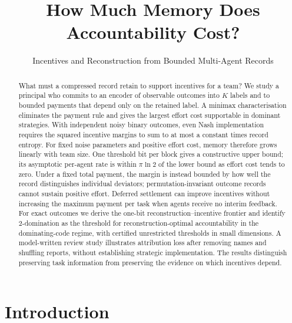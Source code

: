 \documentclass[sigconf,anonymous,acmthm=false]{aamas}
\theoremstyle{acmplain}
\theoremstyle{acmdefinition}
\begin{document}
\title[How Much Memory Does Accountability Cost?]{How Much Memory Does Accountability Cost?}
\subtitle{Incentives and Reconstruction from Bounded Multi-Agent Records}

\begin{abstract}
What must a compressed record retain to support incentives for a team? We study a principal
who commits to an encoder of observable outcomes into $K$ labels and to bounded payments
that depend only on the retained label. A minimax characterisation eliminates the payment
rule and gives the largest effort cost supportable in dominant strategies. With independent
noisy binary outcomes, even Nash implementation requires the squared incentive margins to
sum to at most a constant times record entropy. For fixed noise parameters and positive
effort cost, memory therefore grows linearly with team size. One threshold bit per block
gives a constructive upper bound; its asymptotic per-agent rate is within $\pi\ln2$ of the
lower bound as effort cost tends to zero. Under a fixed total payment, the margin is instead
bounded by how well the record distinguishes individual deviators; permutation-invariant
outcome records cannot sustain positive effort. Deferred settlement can improve incentives
without increasing the maximum payment per task when agents receive no interim feedback.
For exact outcomes we derive the one-bit reconstruction--incentive frontier and identify
2-domination as the threshold for reconstruction-optimal accountability in the dominating-code
regime, with certified unrestricted thresholds in small dimensions. A model-written review
study illustrates attribution loss after removing names and shuffling reports, without
establishing strategic implementation. The results distinguish preserving task information
from preserving the evidence on which incentives depend.
\end{abstract}


\maketitle

\section{Introduction}\label{sec:intro}
\end{document}

